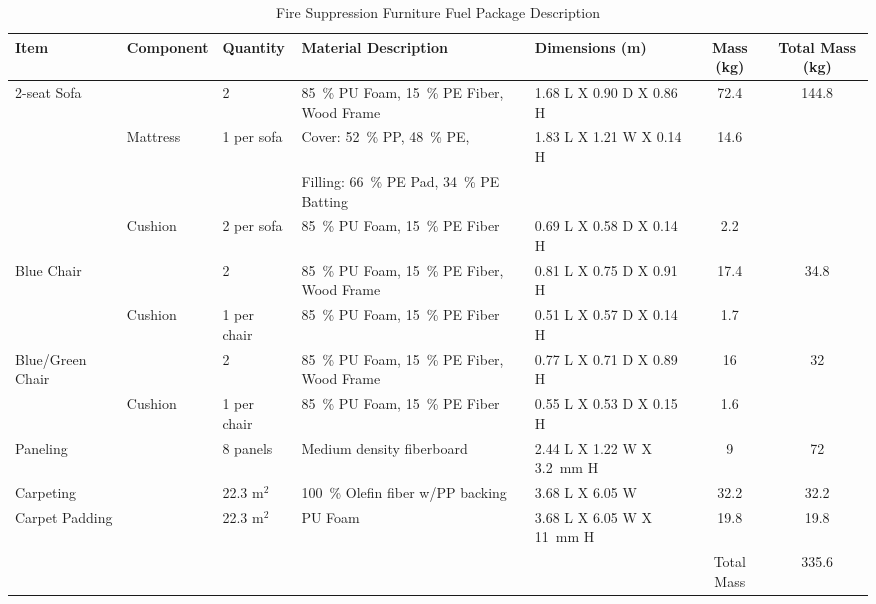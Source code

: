 \documentclass[12pt,oneside]{book}
\begin{document}
\begin{table}
	\centering
	\scriptsize
	\caption{Fire Suppression Furniture Fuel Package Description}
	\renewcommand{\tabcolsep}{1pt}
	\begin{tabular}{lllllcc}
		\toprule[1.5pt]
		Item               & Component		& Quantity		&  Material Description             			&  Dimensions (m)            	&  Mass (kg)  		& Total Mass (kg) \\
		\midrule
		2-seat Sofa        &				& 2				& 85~\% PU Foam, 15~\% PE Fiber, Wood Frame 	&  1.68 L X 0.90 D X 0.86 H  	&  72.4    			& 144.8 \\
		           	 	   & Mattress	    & 1 per sofa	& Cover: 52~\% PP, 48~\% PE,                    &  1.83 L X 1.21 W X 0.14 H     &  14.6             & \\
		           	 	   &                &               & Filling: 66~\% PE Pad, 34~\% PE Batting       &                               &                   & \\
			           	   & Cushion    	& 2 per sofa	& 85~\% PU Foam, 15~\% PE Fiber   				&  0.69 L X 0.58 D X 0.14 H  	&  2.2     			& \\
		Blue Chair         &				& 2				& 85~\% PU Foam, 15~\% PE Fiber, Wood Frame   	&  0.81 L X 0.75 D X 0.91 H  	&  17.4    			& 34.8 \\
		    			   & Cushion        & 1 per chair   & 85~\% PU Foam, 15~\% PE Fiber	    			&  0.51 L X 0.57 D X 0.14 H  	&  1.7    			& \\
		Blue/Green Chair   & 				& 2				& 85~\% PU Foam, 15~\% PE Fiber, Wood Frame     &  0.77 L X 0.71 D X 0.89 H  	&  16    			& 32 \\
		                   & Cushion    	& 1 per chair	& 85~\% PU Foam, 15~\% PE Fiber 		        &  0.55 L X 0.53 D X 0.15 H  	&  1.6    			& \\
		Paneling           &				& 8 panels		& Medium density fiberboard                     &  2.44 L X 1.22 W X 3.2~mm H   &  9    			& 72 \\
		Carpeting          &				& 22.3 m$^2$	& 100~\% Olefin fiber w/PP backing		     	&  3.68 L X 6.05 W  			&  32.2				& 32.2 \\
		Carpet Padding     &				& 22.3 m$^2$	& PU Foam                  	 				    &  3.68 L X 6.05 W X 11~mm H    &  19.8			    & 19.8 \\
		                   &                &               &                                               &                               & Total Mass        & 335.6 \\
		\bottomrule[1.25pt]
	\end{tabular}
	\label{tab:Fire_Suppression_Fuel_Masses}
\end{table}
\end{document}
